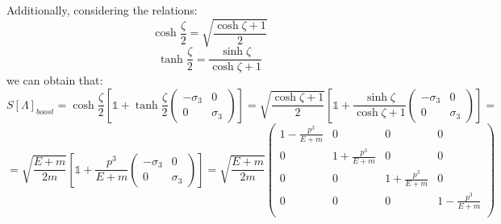 \documentclass[12pt]{article}
\begin{document}
Additionally, considering the relations:
\[
    \cosh{\frac{\zeta}{2}} = \sqrt{\frac{\cosh{\zeta}+1}{2}}
\]
\[
    \tanh{\frac{\zeta}{2}} = \frac{\sinh{\zeta}}{\cosh{\zeta}+1}
\]
we can obtain that:
\[
    S[\Lambda]_{boost}= \cosh{\frac{\zeta}{2}}\left[\mathbb{1}+\tanh{\frac{\zeta}{2}}\begin{pmatrix}
        -\sigma_3 & 0 \\
        0 & \sigma_3
    \end{pmatrix}\right] = \sqrt{\frac{\cosh{\zeta}+1}{2}}\left[\mathbb{1}+\frac{\sinh{\zeta}}{\cosh{\zeta}+1}\begin{pmatrix}
        -\sigma_3 & 0 \\
        0 & \sigma_3
    \end{pmatrix}\right]=
\]
\[
    = \sqrt{\frac{E + m}{2m}}\left[\mathbb{1}+\frac{p^3}{E+m}\begin{pmatrix}
        -\sigma_3 & 0 \\
        0 & \sigma_3
    \end{pmatrix}\right] =\sqrt{\frac{E + m}{2m}}
    \begin{pmatrix}
        1-\frac{p^3}{E+m} & 0 & 0 & 0 \\
        0 & 1+\frac{p^3}{E+m} & 0 & 0 \\
        0 & 0 & 1+\frac{p^3}{E+m} & 0 \\
        0 & 0 & 0 & 1-\frac{p^3}{E+m} \\
    \end{pmatrix}
\]
\end{document}
